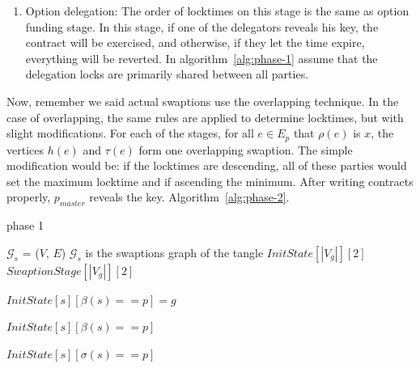 \begin{enumerate}
\begin{enumerate}
        \item Option delegation: The order of locktimes on this stage is the same as option funding stage. In this stage, if one of the delegators reveals his key, the contract will be exercised, and otherwise, if they let the time expire, everything will be reverted. In algorithm~\ref{alg:phase-1} assume that the delegation locks are primarily shared between all parties.

    \end{enumerate}
    
    Now, remember we said actual swaptions use the overlapping technique. In the case of overlapping, the same rules are applied to determine locktimes, but with slight modifications. For each of the stages, for all $e \in E_p$ that $\rho(e)$ is $x$, the vertices $h(e)$ and $\tau(e)$ form one overlapping swaption. The simple modification would be: if the locktimes are descending, all of these parties would set the maximum locktime and if ascending the minimum. After writing contracts properly, $p_{master}$ reveals the \Aone key. Algorithm~\ref{alg:phase-2}.


    
\begin{algorithm}[H]
\centering
\caption{phase 1}
\label{alg:phase-1}
\begin{algorithmic}[1]
\State $\mathcal{G}_s$ = ($V$, $E$) \Comment $\mathcal{G}_s$ is the swaptions graph of the tangle
\State $InitState[|V_g|][2]$ 
\State $SwaptionStage[|V_g|][2]$ 

\State
    $InitState[s][\beta(s)== p] = g $
\EndFunction

\State
    \Return $InitState[s][\beta(s)== p]$
\EndFunction

\State
    \Return $InitState[s][\sigma(s)== p]$
\EndFunction


\end{algorithmic}
\end{algorithm}
\end{enumerate}
